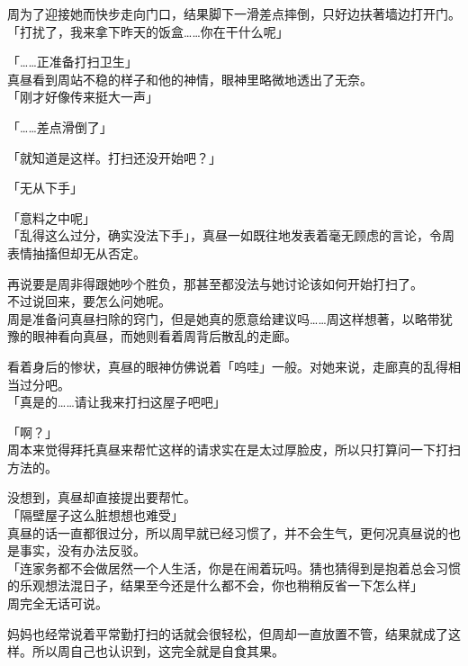 周为了迎接她而快步走向门口，结果脚下一滑差点摔倒，只好边扶著墙边打开门。\\

「打扰了，我来拿下昨天的饭盒……你在干什么呢」

「……正准备打扫卫生」\\

真昼看到周站不稳的样子和他的神情，眼神里略微地透出了无奈。\\

「刚才好像传来挺大一声」

「……差点滑倒了」

「就知道是这样。打扫还没开始吧？」

「无从下手」

「意料之中呢」\\

「乱得这么过分，确实没法下手」，真昼一如既往地发表着毫无顾虑的言论，令周表情抽搐但却无从否定。

再说要是周非得跟她吵个胜负，那甚至都没法与她讨论该如何开始打扫了。\\

不过说回来，要怎么问她呢。\\

周是准备问真昼扫除的窍门，但是她真的愿意给建议吗……周这样想著，以略带犹豫的眼神看向真昼，而她则看着周背后散乱的走廊。

看着身后的惨状，真昼的眼神仿佛说着「呜哇」一般。对她来说，走廊真的乱得相当过分吧。\\

「真是的……请让我来打扫这屋子吧吧」

「啊？」\\

周本来觉得拜托真昼来帮忙这样的请求实在是太过厚脸皮，所以只打算问一下打扫方法的。

没想到，真昼却直接提出要帮忙。\\

「隔壁屋子这么脏想想也难受」\\

真昼的话一直都很过分，所以周早就已经习惯了，并不会生气，更何况真昼说的也是事实，没有办法反驳。\\

「连家务都不会做居然一个人生活，你是在闹着玩吗。猜也猜得到是抱着总会习惯的乐观想法混日子，结果至今还是什么都不会，你也稍稍反省一下怎么样」\\

周完全无话可说。

妈妈也经常说着平常勤打扫的话就会很轻松，但周却一直放置不管，结果就成了这样。所以周自己也认识到，这完全就是自食其果。\\

